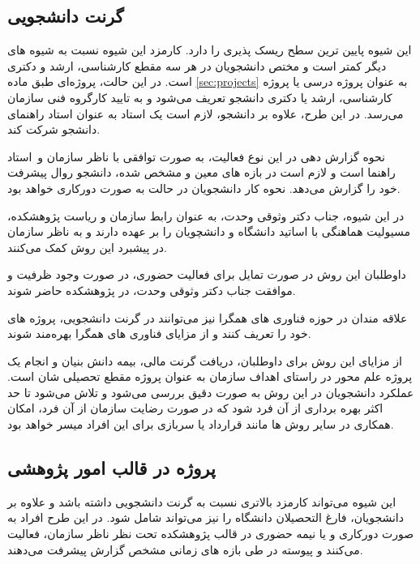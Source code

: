 \subsection{گرنت دانشجویی}
این شیوه پایین ترین سطح ریسک پذیری را دارد. کارمزد این شیوه نسبت به شیوه های دیگر کمتر است و مختص دانشجویان در هر سه مقطع کارشناسی، ارشد و دکتری است. در این حالت، پروژه‌ای طبق ماده
\ref{sec:projects}
به عنوان پروژه درسی یا پروژه کارشناسی، ارشد یا دکتری دانشجو تعریف می‌شود و به تایید کارگروه فنی سازمان می‌رسد. 
در این طرح، علاوه بر دانشجو، لازم است یک استاد به عنوان استاد راهنمای دانشجو شرکت کند.


نحوه گزارش دهی در این نوع فعالیت، به صورت توافقی با ناظر سازمان و استاد راهنما است و لازم است در بازه های معین و مشخص شده، دانشجو روال پیشرفت خود را گزارش می‌دهد. نحوه کار دانشجویان در حالت به صورت دورکاری خواهد بود.

در این شیوه، جناب دکتر وثوقی وحدت، به عنوان رابط سازمان و ریاست پژوهشکده، مسیولیت هماهنگی با اساتید دانشگاه و دانشچویان را بر عهده دارند و به ناظر سازمان در پیشبرد این روش کمک می‌کنند.

\begin{note}
	داوطلبان این روش در صورت تمایل برای فعالیت حضوری، در صورت وجود ظرفیت و موافقت جناب دکتر وثوقی وحدت، در پژوهشکده حاضر شوند.
\end{note}

\begin{note}
	علاقه مندان در حوزه فناوری های همگرا 
	نیز می‌توانند در گرنت دانشجویی، پروژه های خود را تعریف کنند و از مزایای فناوری های همگرا بهره‌مند شوند.
\end{note}


از مزایای این روش برای داوطلبان، دریافت گرنت مالی، بیمه دانش بنیان و انجام یک پروژه علم محور در راستای اهداف سازمان به عنوان پروژه مقطع تحصیلی شان است. عملکرد دانشجویان در این روش به صورت دقیق بررسی می‌شود و تلاش می‌شود تا حد اکثر بهره برداری از آن فرد شود که در صورت رضایت سازمان از آن فرد، امکان همکاری در سایر روش ها مانند قرارداد یا سربازی برای این افراد میسر خواهد بود.

\subsection{پروژه در قالب امور پژوهشی}
این شیوه می‌تواند کارمزد بالاتری نسبت به گرنت دانشجویی داشته باشد و علاوه بر دانشجویان، فارغ التحصیلان دانشگاه را نیز می‌تواند شامل شود. در این طرح افراد به صورت دورکاری و یا نیمه حضوری در قالب پژوهشکده تحت نظر ناظر سازمان، فعالیت می‌کنند و پیوسته در طی بازه های زمانی مشخص گزارش پیشرفت می‌دهند.

